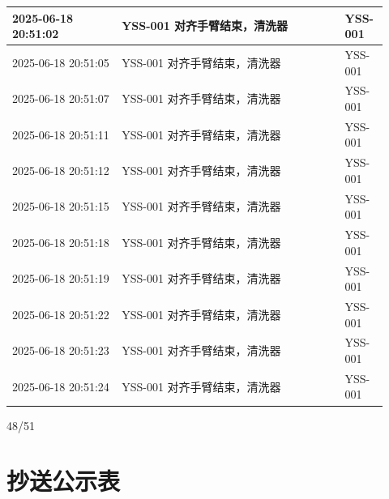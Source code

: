 \documentclass[UTF8,10pt,a4paper,fontset=fandol]{ctexart}
\begin{document}
\begin{center}
\begin{tabular}{|p{0.27\linewidth}|p{0.55\linewidth}|p{0.10\linewidth}|}
2025-06-18 20:51:02 & YSS-001 对齐手臂结束，清洗器 & YSS-001 \\ \hline
2025-06-18 20:51:05 & YSS-001 对齐手臂结束，清洗器 & YSS-001 \\ \hline
2025-06-18 20:51:07 & YSS-001 对齐手臂结束，清洗器 & YSS-001 \\ \hline
2025-06-18 20:51:11 & YSS-001 对齐手臂结束，清洗器 & YSS-001 \\ \hline
2025-06-18 20:51:12 & YSS-001 对齐手臂结束，清洗器 & YSS-001 \\ \hline
2025-06-18 20:51:15 & YSS-001 对齐手臂结束，清洗器 & YSS-001 \\ \hline
2025-06-18 20:51:18 & YSS-001 对齐手臂结束，清洗器 & YSS-001 \\ \hline
2025-06-18 20:51:19 & YSS-001 对齐手臂结束，清洗器 & YSS-001 \\ \hline
2025-06-18 20:51:22 & YSS-001 对齐手臂结束，清洗器 & YSS-001 \\ \hline
2025-06-18 20:51:23 & YSS-001 对齐手臂结束，清洗器 & YSS-001 \\ \hline
2025-06-18 20:51:24 & YSS-001 对齐手臂结束，清洗器 & YSS-001 \\ \hline
\end{tabular}
\end{center}

\begin{center}
48/51
\end{center}

\newpage

\section*{抄送公示表}
\end{document}
